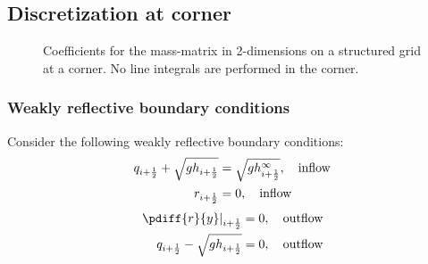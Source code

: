 \subsection{Discretization at corner}
\begin{figure}[H]
    \begin{center}
        \def\svgwidth{0.8\textwidth} %
        \resizebox{0.65\textwidth}{!}{
            
        }
    \end{center}
    \caption{Coefficients for the mass-matrix in 2-dimensions on a structured grid at a corner. No line integrals are performed in the corner.}
    \label{fig:structured_grid_at_corner}
\end{figure}
\subsubsection{Weakly reflective boundary conditions}
Consider the following weakly reflective boundary conditions:
\begin{align}
    q_{i+\frac{1}{2}} + \sqrt{gh_{i+\frac{1}{2}}} &= \sqrt{gh^\infty_{i+\frac{1}{2}}}, \quad \text{inflow}
    \\
    r_{i+\frac{1}{2}} &= 0, \quad \text{inflow}
\end{align}
\begin{align}
    \left.\pdiff{r}{y}\right|_{i+\half} &= 0, \quad \text{outflow}
    \\
    q_{i+\half} - \sqrt{gh_{i+\half}} & = 0, \quad \text{outflow}
\end{align}